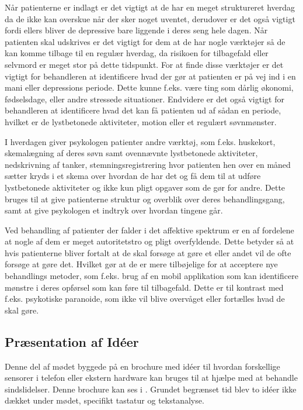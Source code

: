 Når patienterne er indlagt er det vigtigt at de har en meget struktureret hverdag da de ikke kan overskue når der sker noget uventet, derudover er det også vigtigt fordi ellers bliver de depressive bare liggende i deres seng hele dagen.
Når patienten skal udskrives er det vigtigt for dem at de har nogle værktøjer så de kan komme tilbage til en regulær hverdag, da risikoen for tilbagefald eller selvmord er meget stor på dette tidspunkt. 
For at finde disse værktøjer er det vigtigt for behandleren at identificere hvad der gør at patienten er på vej ind i en mani eller depressions periode.
Dette kunne f.eks. være ting som dårlig økonomi, fødselsdage, eller andre stressede situationer.
Endvidere er det også vigtigt for behandleren at identificere hvad det kan få patienten ud af sådan en periode, hvilket er de lystbetonede aktiviteter, motion eller et regulært søvnmønster.

I hverdagen giver psykologen patienter andre værktøj, som f.eks. huskekort, skemalægning af deres søvn samt ovennævnte lystbetonede aktiviteter, nedskrivning af tanker, stemningsregistrering hvor patienten hen over en måned sætter kryds i et skema over hvordan de har det og få dem til at udføre lystbetonede aktiviteter og ikke kun pligt opgaver som de gør for andre. 
Dette bruges til at give patienterne struktur og overblik over deres behandlingsgang, samt at give psykologen et indtryk over hvordan tingene går.  

Ved behandling af patienter der falder i det affektive spektrum er en af fordelene at nogle af dem er meget autoritetstro og pligt overfyldende.
Dette betyder så at hvis patienterne bliver fortalt at de skal forsøge at gøre et eller andet vil de ofte forsøge at gøre det.
Hvilket gør at de er mere tilbøjelige for at acceptere nye behandlings metoder, som f.eks. brug af en mobil applikation som kan identificere mønstre i deres opførsel som kan føre til tilbagefald. 
Dette er til kontrast med f.eks. psykotiske paranoide, som ikke vil blive overvåget eller fortælles hvad de skal gøre. 

\subsection{Præsentation af Idéer}\label{janne_ideer}
Denne del af mødet byggede på en brochure med idéer til hvordan forskellige sensorer i telefon eller ekstern hardware kan bruges til at hjælpe med at behandle sindslidelser. 
Denne brochure kan ses i .
Grundet begrænset tid blev to idéer ikke dækket under mødet, specifikt tastatur og tekstanalyse.


